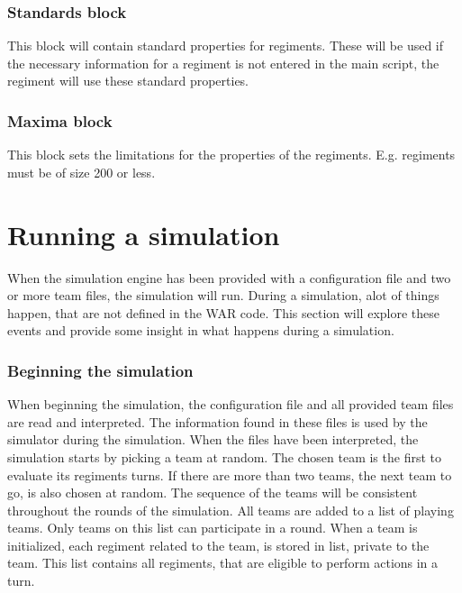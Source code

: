 		\subsubsection{Standards block}
		This block will contain standard properties for regiments. These will be used if the necessary 
		information for a regiment is not entered in the main script, the regiment will use these standard properties.
		
		\subsubsection{Maxima block}
		This block sets the limitations for the properties of the regiments. E.g. regiments must be of size 200 or less.

\section{ Running a simulation }
	When the simulation engine has been provided with a configuration file and two or more team files, the simulation will run. During a simulation, alot of things happen, that are not defined in the WAR code. This section will explore these events and provide some insight in what happens during a simulation.
		\subsubsection{Beginning the simulation}
		When beginning the simulation, the configuration file and all provided team files are read and interpreted. The information found in these files is used by the simulator during the simulation. When the files have been interpreted, the simulation starts by picking a team at random. The chosen team is the first to evaluate its regiments turns. If there are more than two teams, the next team to go, is also chosen at random. The sequence of the teams will be consistent throughout the rounds of the simulation. All teams are added to a list of playing teams. Only teams on this list can participate in a round. When a team is initialized, each regiment related to the team, is stored in list, private to the team. This list contains all regiments, that are eligible to perform actions in a turn. 
